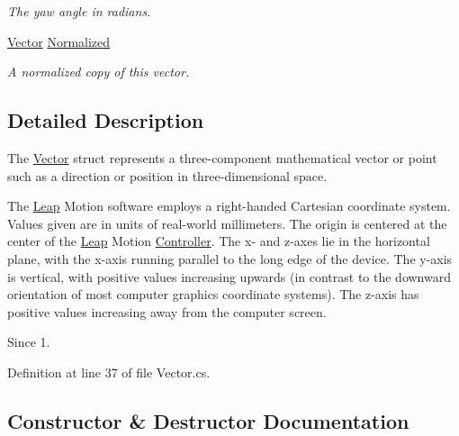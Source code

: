 \begin{DoxyCompactItemize}
\begin{DoxyCompactList}\small\item\em The yaw angle in radians. \end{DoxyCompactList}\item 
\mbox{\hyperlink{struct_leap_1_1_vector}{Vector}} \mbox{\hyperlink{struct_leap_1_1_vector_a14c14f9559420ad1f1a9e1b8884859c4}{Normalized}}
\begin{DoxyCompactList}\small\item\em A normalized copy of this vector. \end{DoxyCompactList}\end{DoxyCompactItemize}


\subsection{Detailed Description}
The \mbox{\hyperlink{struct_leap_1_1_vector}{Vector}} struct represents a three-\/component mathematical vector or point such as a direction or position in three-\/dimensional space. 

The \mbox{\hyperlink{namespace_leap}{Leap}} Motion software employs a right-\/handed Cartesian coordinate system. Values given are in units of real-\/world millimeters. The origin is centered at the center of the \mbox{\hyperlink{namespace_leap}{Leap}} Motion \mbox{\hyperlink{class_leap_1_1_controller}{Controller}}. The x-\/ and z-\/axes lie in the horizontal plane, with the x-\/axis running parallel to the long edge of the device. The y-\/axis is vertical, with positive values increasing upwards (in contrast to the downward orientation of most computer graphics coordinate systems). The z-\/axis has positive values increasing away from the computer screen. \begin{DoxySince}{Since}
1. 
\end{DoxySince}


Definition at line 37 of file Vector.\+cs.



\subsection{Constructor \& Destructor Documentation}
\mbox{\label{struct_leap_1_1_vector_a2d4bd80855cf435476d47c378a22ca8d}} 
